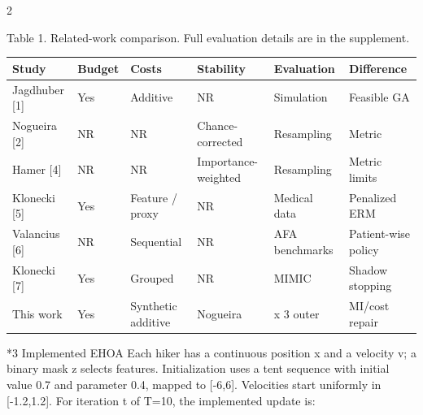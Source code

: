 \documentclass[10pt,a4paper]{article}
\makeatletter
\renewcommand{\section}{\@startsection{section}{1}{0pt}{5pt}{2pt}{\normalfont\normalsize\bfseries}}
\newcommand{\sect}[1]{\section*{#1}}
\makeatother
\begin{document}
\begin{multicols}{2}
\par\vspace{3pt}\begin{minipage}{\linewidth}{\footnotesize Table 1. Related-work comparison. Full evaluation details are in the supplement.\par}
{\fontsize{6.8}{8.3}\selectfont\setlength{\tabcolsep}{2pt}\renewcommand{\arraystretch}{1.1}
\begin{tabularx}{\linewidth}{>{\hsize=1.0000\hsize\raggedright\arraybackslash}X>{\hsize=1.0000\hsize\raggedright\arraybackslash}X>{\hsize=1.0000\hsize\raggedright\arraybackslash}X>{\hsize=1.0000\hsize\raggedright\arraybackslash}X>{\hsize=1.0000\hsize\raggedright\arraybackslash}X>{\hsize=1.0000\hsize\raggedright\arraybackslash}X}\toprule
Study & Budget & Costs & Stability & Evaluation & Difference\\\midrule
Jagdhuber [1] & Yes & Additive & NR & Simulation & Feasible GA\\
Nogueira [2] & NR & NR & Chance-corrected & Resampling & Metric\\
Hamer [4] & NR & NR & Importance-weighted & Resampling & Metric limits\\
Klonecki [5] & Yes & Feature / proxy & NR & Medical data & Penalized ERM\\
Valancius [6] & NR & Sequential & NR & AFA benchmarks & Patient-wise policy\\
Klonecki [7] & Yes & Grouped & NR & MIMIC & Shadow stopping\\
This work & Yes & Synthetic additive & Nogueira & 2 x 3 outer & MI/cost repair\\
\bottomrule\end{tabularx}}
\end{minipage}\par\vspace{3pt}
\sect{3  Implemented EHOA}
Each hiker has a continuous position x and a velocity v; a binary mask z selects features. Initialization uses a tent sequence with initial value 0.7 and parameter 0.4, mapped to [-6,6]. Velocities start uniformly in [-1.2,1.2]. For iteration t of T=10, the implemented update is:


\end{multicols}
\end{document}

